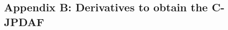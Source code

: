 \begin{appendix}
\begin{itemize}
\end{itemize}



\subsection*{Appendix B: Derivatives to obtain the C-JPDAF}


\end{appendix}
